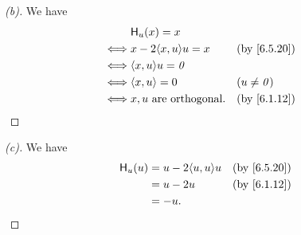 \begin{proof}[(b)]
  We have
  \begin{align*}
         & \lt{H}_u(x) = x                                \\
    \iff & x - 2 \inn{x, u} u = x       &  & \by{6.5.20}  \\
    \iff & \inn{x, u} u = \zv                             \\
    \iff & \inn{x, u} = 0               &  & (u \neq \zv) \\
    \iff & x, u \text{ are orthogonal}. &  & \by{6.1.12}
  \end{align*}
\end{proof}

\begin{proof}[(c)]
  We have
  \begin{align*}
    \lt{H}_u(u) & = u - 2 \inn{u, u} u &  & \by{6.5.20} \\
                & = u - 2u             &  & \by{6.1.12} \\
                & = -u.
  \end{align*}
\end{proof}

